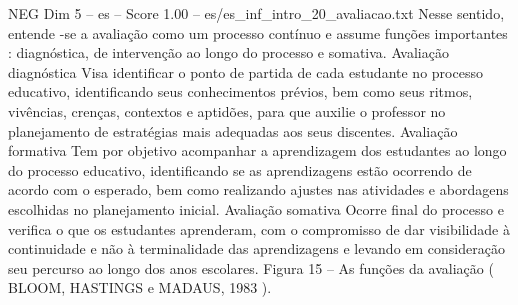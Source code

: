 \begin{textsample}{NEG Dim 5 – es – Score 1.00 – es/es\_inf\_intro\_20\_avaliacao.txt}
Nesse sentido, entende -se a avaliação como um processo contínuo e assume funções importantes : diagnóstica, de intervenção ao longo do processo e somativa.
Avaliação diagnóstica Visa identificar o ponto de partida de cada estudante no processo educativo, identificando seus conhecimentos prévios, bem como seus ritmos, vivências, crenças, contextos e aptidões, para que auxilie o professor no planejamento de estratégias mais adequadas aos seus discentes.
Avaliação formativa Tem por objetivo acompanhar a aprendizagem dos estudantes ao longo do processo educativo, identificando se as aprendizagens estão ocorrendo de acordo com o esperado, bem como realizando ajustes nas atividades e abordagens escolhidas no planejamento inicial.
Avaliação somativa Ocorre final do processo e verifica o que os estudantes aprenderam, com o compromisso de dar visibilidade à continuidade e não à terminalidade das aprendizagens e levando em consideração seu percurso ao longo dos anos escolares.
Figura 15 – As funções da avaliação ( BLOOM, HASTINGS e MADAUS, 1983 ).

\end{textsample}
